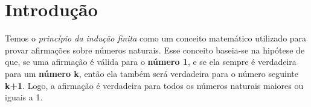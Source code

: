 \section{Introdução}

Temos o \emph{princípio da indução finita} como um conceito matemático utilizado para provar afirmações sobre números naturais. Esse conceito baseia-se na hipótese de que, se uma afirmação é válida para o \textbf{número 1}, e se ela sempre é verdadeira para um \textbf{número k}, então ela também será verdadeira para o número seguinte \textbf{k+1}. Logo, a afirmação é verdadeira para todos os números naturais maiores ou iguais a 1.